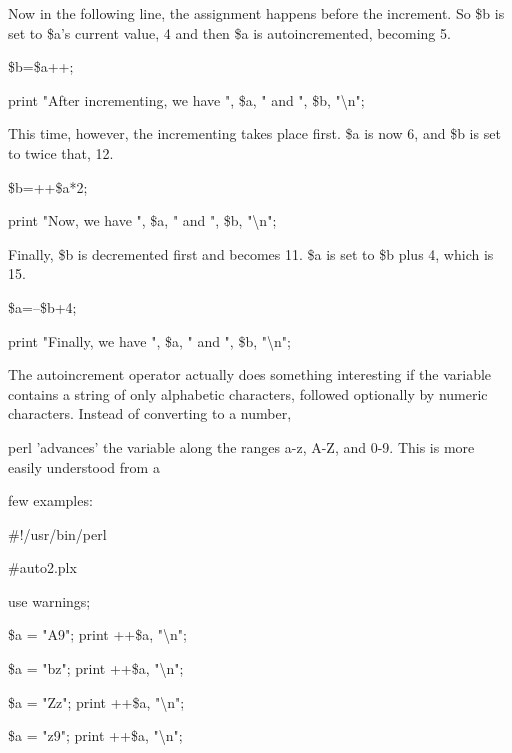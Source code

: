 \documentclass[a4paper,11pt]{book}
\begin{document}
\noindent 

\noindent Now in the following line, the assignment happens before the increment. So \$b is set to \$a's current value, 4 and then \$a is autoincremented, becoming 5.

\noindent 

\noindent 

\noindent \$b=\$a++;

\noindent print "After incrementing, we have ", \$a, " and ", \$b, "\textbackslash n";

\noindent 

\noindent This time, however, the incrementing takes place first. \$a is now 6, and \$b is set to twice that, 12.

\noindent 

\noindent 

\noindent \$b=++\$a*2;

\noindent print "Now, we have ", \$a, " and ", \$b, "\textbackslash n";

\noindent 

\noindent 

\noindent Finally, \$b is decremented first and becomes 11. \$a is set to \$b plus 4, which is 15.

\noindent 

\noindent \$a=--\$b+4;

\noindent print "Finally, we have ", \$a, " and ", \$b, "\textbackslash n";

\noindent 

\noindent The autoincrement operator actually does something interesting if the variable contains a string of only alphabetic characters, followed optionally by numeric characters. Instead of converting to a number,

\noindent perl 'advances' the variable along the ranges a-z, A-Z, and 0-9. This is more easily understood from a

\noindent few examples:

\noindent 

\noindent \#!/usr/bin/perl

\noindent \#auto2.plx

\noindent use warnings;

\noindent \$a = "A9"; print ++\$a, "\textbackslash n";

\noindent \$a = "bz"; print ++\$a, "\textbackslash n";

\noindent \$a = "Zz"; print ++\$a, "\textbackslash n";

\noindent \$a = "z9"; print ++\$a, "\textbackslash n";
\end{document}
